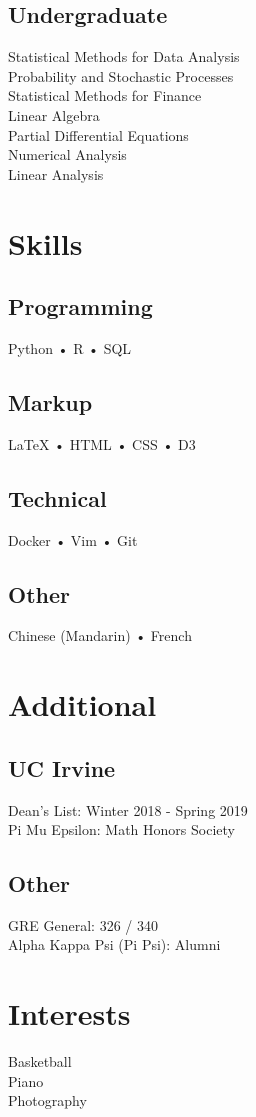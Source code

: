 \documentclass[]{deedy-resume-openfont}
\begin{document}
\begin{minipage}[t]{0.33\textwidth}
\subsection{Undergraduate} 
Statistical Methods for Data Analysis \\
Probability and Stochastic Processes \\
Statistical Methods for Finance \\
Linear Algebra \\
Partial Differential Equations \\
Numerical Analysis \\
Linear Analysis \\
\sectionsep


\section{Skills}
\subsection{Programming}
Python • R • SQL 
\subsection{Markup}
{\LaTeX} • HTML • CSS • D3
\subsection{Technical}
Docker • Vim • Git
\subsection{Other}
Chinese (Mandarin) • French
\sectionsep


\section{Additional}
\subsection{UC Irvine}
Dean's List: Winter 2018 - Spring 2019 \\
Pi Mu Epsilon: Math Honors Society \\
\subsection{Other}
GRE General: 326 / 340 \\
Alpha Kappa Psi (Pi Psi): Alumni
\sectionsep

\section{Interests}
Basketball \\ Piano \\ Photography 
\sectionsep

%
%

\end{minipage} 
\end{document}
